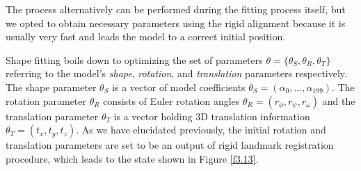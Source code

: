 The process alternatively can be performed during the fitting process itself, but we opted to obtain necessary parameters using the rigid alignment because it is usually very fast and leads the model to a correct initial position. \bigskip

Shape fitting boils down to optimizing the set of parameters $\theta = \{\theta_S, \theta_R, \theta_T\}$ referring to the model's \textit{shape}, \textit{rotation}, and \textit{translation} parameters respectively. The shape parameter $\theta_S$ is a vector of model coefficients $\theta_S = (\alpha_0,\dots,\alpha_{199})$. The rotation parameter $\theta_R$ consists of Euler rotation angles $\theta_R = (r_\phi, r_\psi, r_\omega)$ and the translation parameter $\theta_T$ is a vector holding 3D translation information $\theta_T = (t_x, t_y, t_z)$. As we have elucidated previously, the initial rotation and translation parameters are set to be an output of rigid landmark registration procedure, which leads to the state shown in Figure \ref{f3.13}.

